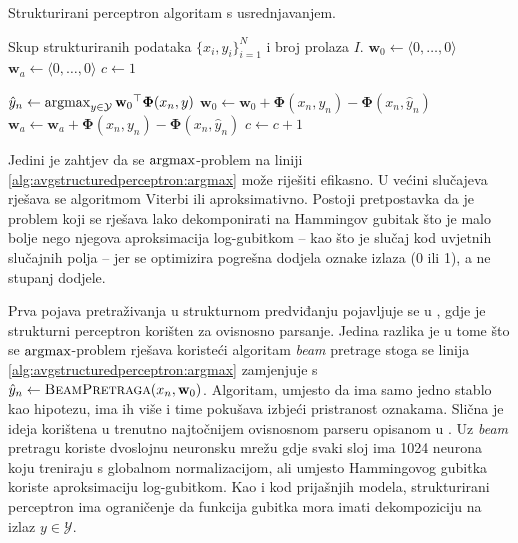 \begin{algorithm}
\caption{Strukturirani perceptron algoritam s usrednjavanjem.}
\label{alg:avgstructuredperceptron}
\begin{algorithmic}[1]
\Require Skup strukturiranih podataka $\{x_i, y_i\}_{i=1}^N$ i broj prolaza $I$.
\State $\mathbf{w}_0 \gets \langle 0, \ldots, 0 \rangle$
\State $\mathbf{w}_a \gets \langle 0, \ldots, 0 \rangle$
\State $c \gets 1$

    \State $\hat{y}_n \gets \operatorname*{argmax}_{y \in \mathcal{Y}} {\mathbf{w}_0}^\top \mathbf{\Phi}(x_n, y)$ \label{alg:avgstructuredperceptron:argmax}
    \label{alg:structuredperceptron:condition}
    \State $\mathbf{w}_0 \gets \mathbf{w}_0 + \mathbf{\Phi}(x_n, y_n) - \mathbf{\Phi}(x_n, \hat{y}_n)$
    \State $\mathbf{w}_a \gets \mathbf{w}_a + \mathbf{\Phi}(x_n, y_n) - \mathbf{\Phi}(x_n, \hat{y}_n)$
    \EndIf
    \State $c \gets c + 1$
  \EndFor

\EndFor

\State {}
\end{algorithmic}
\end{algorithm}

Jedini je zahtjev da se $\operatorname*{argmax}$-problem na liniji
\ref{alg:avgstructuredperceptron:argmax} može riješiti efikasno. U većini
slučajeva rješava se algoritmom Viterbi ili aproksimativno. Postoji pretpostavka
da je problem koji se rješava lako dekomponirati na Hammingov gubitak što je
malo bolje nego njegova aproksimacija log-gubitkom -- kao što je slučaj kod
uvjetnih slučajnih polja -- jer se optimizira pogrešna dodjela oznake izlaza (0
ili 1), a ne stupanj dodjele.

Prva pojava pretraživanja u strukturnom predviđanju pojavljuje se u
\citep{collins2004incremental}, gdje je strukturni perceptron korišten za
ovisnosno parsanje. Jedina razlika je u tome što se $\operatorname*{argmax}$-problem rješava
koristeći algoritam \textit{beam} pretrage stoga se linija
\ref{alg:avgstructuredperceptron:argmax} zamjenjuje s $\hat{y}_n \gets
\textsc{BeamPretraga}(x_n, \mathbf{w}_0)$. Algoritam, umjesto da ima samo jedno
stablo kao hipotezu, ima ih više i time pokušava izbjeći pristranost oznakama.
Slična je ideja korištena u trenutno najtočnijem ovisnosnom parseru opisanom u
\citep{andor2016globally}. Uz \textit{beam} pretragu koriste dvoslojnu neuronsku
mrežu gdje svaki sloj ima 1024 neurona koju treniraju s globalnom
normalizacijom, ali umjesto Hammingovog gubitka koriste aproksimaciju
log-gubitkom. Kao i kod prijašnjih modela, strukturirani perceptron ima
ograničenje da funkcija gubitka mora imati dekompoziciju na izlaz $y \in
\mathcal{Y}$.
